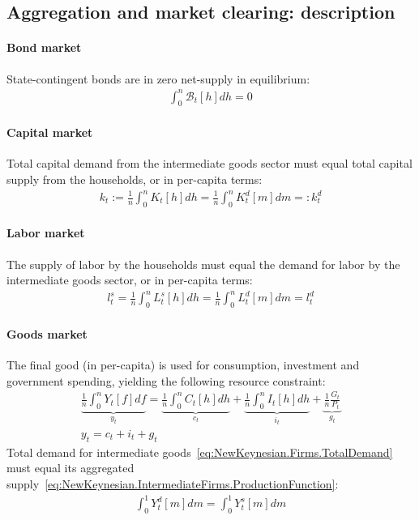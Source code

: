 \newpage

\subsection{Aggregation and market clearing: description}

\paragraph{Bond market}
State-contingent bonds are in zero net-supply in equilibrium:
\begin{align}
\int_{0}^{n} \mathcal{B}_{t}[h] dh = 0 \label{eq:NewKeynesian.BondMarketClearing}
\end{align}

\paragraph{Capital market}
Total capital demand from the intermediate goods sector must equal total capital supply from the households,
  or in per-capita terms:
\begin{align}
k_{t} := \frac{1}{n}\int_{0}^{n} K_{t}[h] dh = \frac{1}{n}\int_{0}^{n} K^{d}_{t}[m] dm =: k^{d}_{t} \label{eq:NewKeynesian.CapitalMarketClearing}
\end{align}

\paragraph{Labor market}
The supply of labor by the households must equal the demand for labor by the intermediate goods sector,
  or in per-capita terms:
\begin{align}
l^{s}_{t} = \frac{1}{n}\int_{0}^{n} L^{s}_{t}[h] dh = \frac{1}{n}\int_{0}^{n} L^{d}_{t}[m] dm = l^{d}_{t} \label{eq:NewKeynesian.LaborMarketClearing}
\end{align}

\paragraph{Goods market}
The final good (in per-capita) is used for consumption, investment and government spending,
  yielding the following resource constraint:
\begin{gather}
\underbrace{\frac{1}{n} \int_{0}^{n} Y_{t}[f] df}_{y_{t}}
= \underbrace{\frac{1}{n} \int_{0}^{n} C_{t}[h] dh}_{c_{t}}
+ \underbrace{\frac{1}{n} \int_{0}^{n} I_{t}[h] dh}_{i_{t}}
+ \underbrace{\frac{1}{n} \frac{G_{t}}{P_{t}}}_{g_{t}}
\nonumber
\\
y_{t} = c_{t} + i_{t} + g_{t} \label{eq:NewKeynesian.ResourceConstraint}
\end{gather}
Total demand for intermediate goods~\eqref{eq:NewKeynesian.Firms.TotalDemand}
  must equal its aggregated supply~\eqref{eq:NewKeynesian.IntermediateFirms.ProductionFunction}:
\begin{align}
\int_{0}^{1} Y^{d}_{t}[m] dm = \int_{0}^{1} Y^{s}_{t}[m] dm \label{eq:NewKeynesian.AggregateSupplyDemand}
\end{align}

